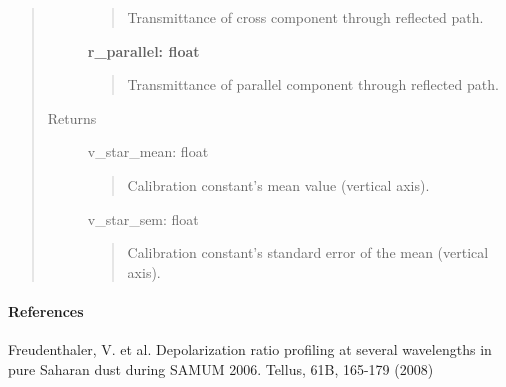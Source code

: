 \documentclass[letterpaper,10pt,english]{sphinxmanual}
\begin{document}
\begin{fulllineitems}
\begin{quote}
\begin{description}
\begin{quote}
Transmittance of cross component through reflected path.
\end{quote}

\textbf{r\_parallel: float}
\begin{quote}

Transmittance of parallel component through reflected path.
\end{quote}

\item[{Returns}] \leavevmode
v\_star\_mean: float
\begin{quote}

Calibration constant's mean value (vertical axis).
\end{quote}

v\_star\_sem: float
\begin{quote}

Calibration constant's standard error of the mean (vertical axis).
\end{quote}

\end{description}\end{quote}
\paragraph{References}

Freudenthaler, V. et al. Depolarization ratio profiling at several wavelengths in pure
Saharan dust during SAMUM 2006. Tellus, 61B, 165-179 (2008)

\end{fulllineitems}

\end{document}
